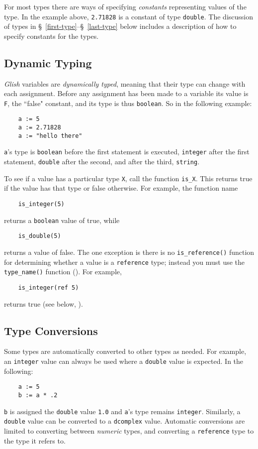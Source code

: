For most types there are ways of specifying {\em constants} representing
values of the type.  In the example above, {\tt 2.71828} is a constant
of type {\tt double}.  The discussion of types in
\S~\ref{first-type}--\S~\ref{last-type} below includes a description
of how to specify constants for the types.

\subsection{Dynamic Typing}

{\em Glish} variables are {\em dynamically typed\/},
meaning that their type
can change with each assignment.  Before any assignment has been made
to a variable its value is {\tt F}, the ``false" constant, and its
type is thus {\tt boolean}.  So in the following example:
\begin{verbatim}
    a := 5
    a := 2.71828
    a := "hello there"
\end{verbatim}
{\tt a}'s type is {\tt boolean} before the first statement is executed,
{\tt integer} after the first statement,
{\tt double} after the second, and after the third, {\tt string}.

To see if a value has a particular type {\tt X}, call the function
{\tt is\_X}.
This returns true if the value has that type or false otherwise.  For
example, the function name
\begin{verbatim}
    is_integer(5)
\end{verbatim}
returns a {\tt boolean} value of true, while
\begin{verbatim}
    is_double(5)
\end{verbatim}
returns a value of false.  The one exception is there is no
{\tt is\_reference()} function
for determining  whether a value is a {\tt reference} type; instead
you must use the {\tt type\_name()} function ().
For example,
\begin{verbatim}
    is_integer(ref 5)
\end{verbatim}
returns true (see below, ).

\subsection{Type Conversions}
\label{type-conversion}

Some types are automatically converted to other types as
needed.
For example, an {\tt integer} value can always be used where a {\tt double}
value is expected.  In the following:
\begin{verbatim}
    a := 5
    b := a * .2
\end{verbatim}
{\tt b} is assigned the {\tt double} value {\tt 1.0} and {\tt a}'s type
remains {\tt integer}. Similarly, a {\tt double} value can be converted
to a {\tt dcomplex} value.
Automatic conversions are limited to converting between {\em numeric} types,
and converting a {\tt reference} type to the type it refers to.

